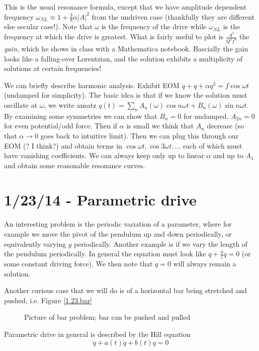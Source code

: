 \documentclass[10pt]{report}
\newcommand{\abs}[1]{\left|#1\right|}
\begin{document}
This is the usual resonance formula, except that we have amplitude dependent frequency $\omega_{NL} \approx 1+\frac{3}{8}\alpha \abs{A}^2$ from the undriven case (thankfully they are different else secular case!). Note that $\omega$ is the frequency of the drive while $\omega_{NL}$ is the frequency at which the drive is greatest. What is fairly useful to plot is $\frac{A^2}{Q^2 f^2}$ the \emph{gain}, which he shows in class with a Mathematica notebook. Bascially the gain looks like a falling-over Lorentzian, and the solution exhibits a multiplicity of solutions at certain frequencies!

We can briefly describe harmonic analysis. Exhibit EOM $\ddot{q} + q + \alpha q^3 = f\cos \omega t$ (undamped for simplicity). The basic idea is that if we know the solution must oscillate at $\omega$, we write ansatz $q(t) = \sum_n A_n(\omega) \cos n\omega t + B_n(\omega)\sin n\omega t$. By examining some symmetries we can show that $B_n = 0$ for undamped, $A_{2n} =0$ for even potential/odd force. Then if $\alpha$ is small we think that $A_n$ decrease (so that $\alpha \to 0$ goes back to intuitive limit). Then we can plug this through our EOM (? I think?) and obtain terms in $\cos \omega t, \cos 3\omega t, \dots$ each of which must have vanishing coefficients. We can always keep only up to linear $\alpha$ and up to $A_1$ and obtain some reasonable resonance curves. 
\chapter{1/23/14 - Parametric drive}

An interesting problem is the periodic variation of a parameter, where for example we move the pivot of the pendulum up and down periodically, or equivalently varying $g$ periodically. Another example is if we vary the length of the pendulum periodically. In general the equation must look like $\ddot{q} + \frac{g}{l}q = 0$ (or some constant driving force). We then note that $q=0$ will always remain a solution.

Another curious case that we will do is of a horizontal bar being stretched and pushed, i.e. Figure \eqref{1.23.bar}
\begin{figure}[!h]
    \centering
    \caption{Picture of bar problem; bar can be pushed and pulled}
    \label{1.23.bar}
\end{figure}
Parametric drive in general is described by the Hill equation
\begin{equation}
    \ddot{q} + a(t)\dot{q} + b(t)q = 0
    \label{1.23.Hill}
\end{equation}
\end{document}
